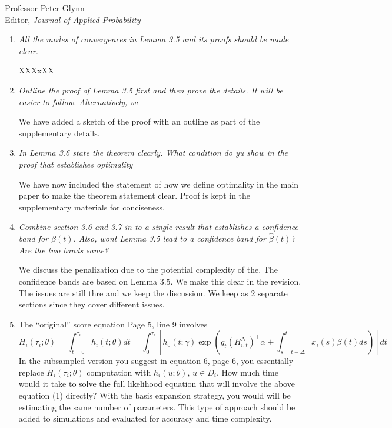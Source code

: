 \documentclass[11pt]{letter} %
\begin{document}
\begin{letter}{Professor
	Peter Glynn\\
	Editor, {\em Journal of Applied Probability}}
\begin{enumerate}
\item {\it All the modes of convergences in Lemma 3.5 and its proofs should be made clear.}

\vspace{5mm}
XXXxXX
\vspace{5mm}

\item {\it Outline the proof of Lemma 3.5 first and then prove the details.  It will be easier to follow.  Alternatively, we }

\vspace{5mm}
We have added a sketch of the proof with an outline as part of the supplementary details.
\vspace{5mm}

\item {\it In Lemma 3.6 state the theorem clearly.  What condition do yu show in the proof that establishes optimality}

\vspace{5mm}
We have now included the statement of how we define optimality in the main paper to make the theorem statement clear.  Proof is kept in the supplementary materials for conciseness.
\vspace{5mm}

\item {\it Combine section 3.6 and 3.7 in to a single result that establishes a confidence band for $\beta (t)$. Also, wont Lemma 3.5 lead to a confidence band for $\hat \beta (t)$? Are the two bands same?}

\vspace{5mm}
We discuss the penalization due to the potential complexity of the.  The confidence bands are based on Lemma 3.5.  We make this clear in the revision.  The issues are still thre and we keep the discussion.  We keep as 2 separate sections since they cover different issues.
\vspace{5mm}

\item The ``original'' score equation Page 5, line 9 involves
$$
H_i (\tau_i ;\theta) = \int_{t=0}^{\tau_i} h_i (t; \theta)dt = \int_0^{\tau_i} \left[ h_0 (t;\gamma) \exp \left( g_t (H_{i,t}^N)^\top \alpha + \int_{s=t-\Delta}^t x_i (s) \beta(t) ds \right) \right] dt
$$
In the subsampled version you suggest in equation 6, page 6, you essentially replace $H_i (\tau_i; \theta)$ computation with $h_i (u; \theta)$, $u \in D_i$. How much time would it take to solve the full likelihood equation that will involve the above equation (1) directly? With the basis expansion strategy, you
would will be estimating the same number of parameters. This type of approach should be added to simulations and evaluated for accuracy and time complexity.


\end{enumerate}
\end{letter}
\end{document}
